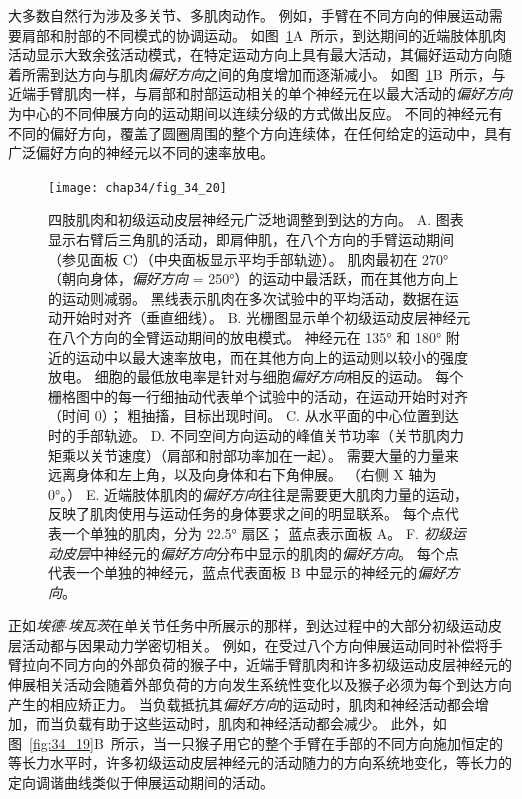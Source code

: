 大多数自然行为涉及多关节、多肌肉动作。
例如，手臂在不同方向的伸展运动需要肩部和肘部的不同模式的协调运动。
如图~\ref{fig:34_20}A~所示，到达期间的近端肢体肌肉活动显示大致余弦活动模式，在特定运动方向上具有最大活动，其偏好运动方向随着所需到达方向与肌肉\textit{偏好方向}之间的角度增加而逐渐减小。
如图~\ref{fig:34_20}B~所示，与近端手臂肌肉一样，与肩部和肘部运动相关的单个神经元在以最大活动的\textit{偏好方向}为中心的不同伸展方向的运动期间以连续分级的方式做出反应。
不同的神经元有不同的偏好方向，覆盖了圆圈周围的整个方向连续体，在任何给定的运动中，具有广泛偏好方向的神经元以不同的速率放电。


\begin{figure}[htbp]
	\centering
	\texttt{[image: chap34/fig\_34\_20]}
	\caption{四肢肌肉和初级运动皮层神经元广泛地调整到到达的方向。
		A. 图表显示右臂后三角肌的活动，即肩伸肌，在八个方向的手臂运动期间（参见面板 C）（中央面板显示平均手部轨迹）。
		肌肉最初在 270°（朝向身体，\textit{偏好方向} = 250°）的运动中最活跃，而在其他方向上的运动则减弱。
		黑线表示肌肉在多次试验中的平均活动，数据在运动开始时对齐（垂直细线）。
		B. 光栅图显示单个初级运动皮层神经元在八个方向的全臂运动期间的放电模式。
		神经元在 135° 和 180° 附近的运动中以最大速率放电，而在其他方向上的运动则以较小的强度放电。
		细胞的最低放电率是针对与细胞\textit{偏好方向}相反的运动。
		每个栅格图中的每一行细抽动代表单个试验中的活动，在运动开始时对齐（时间 0）；
		粗抽搐，目标出现时间\cite{georgopoulos1982relations}。
		C. 从水平面的中心位置到达时的手部轨迹。
		D. 不同空间方向运动的峰值关节功率（关节肌肉力矩乘以关节速度）（肩部和肘部功率加在一起）。
		需要大量的力量来远离身体和左上角，以及向身体和右下角伸展。 （右侧 X 轴为 0°。）
		E. 近端肢体肌肉的\textit{偏好方向}往往是需要更大肌肉力量的运动，反映了肌肉使用与运动任务的身体要求之间的明显联系。
		每个点代表一个单独的肌肉，分为 22.5° 扇区； 蓝点表示面板 A。 
		F. \textit{初级运动皮层}中神经元的\textit{偏好方向}分布中显示的肌肉的\textit{偏好方向}。
		每个点代表一个单独的神经元，蓝点代表面板 B 中显示的神经元的\textit{偏好方向}\cite{scott2001dissociation}。}
	\label{fig:34_20}
\end{figure}


正如\textit{埃德$\cdot$埃瓦茨}在单关节任务中所展示的那样，到达过程中的大部分初级运动皮层活动都与因果动力学密切相关。
例如，在受过八个方向伸展运动同时补偿将手臂拉向不同方向的外部负荷的猴子中，近端手臂肌肉和许多初级运动皮层神经元的伸展相关活动会随着外部负荷的方向发生系统性变化以及猴子必须为每个到达方向产生的相应矫正力。
当负载抵抗其\textit{偏好方向}的运动时，肌肉和神经活动都会增加，而当负载有助于这些运动时，肌肉和神经活动都会减少。
此外，如图~\ref{fig:34_19}B~所示，当一只猴子用它的整个手臂在手部的不同方向施加恒定的等长力水平时，许多初级运动皮层神经元的活动随力的方向系统地变化，等长力的定向调谐曲线类似于伸展运动期间的活动。


